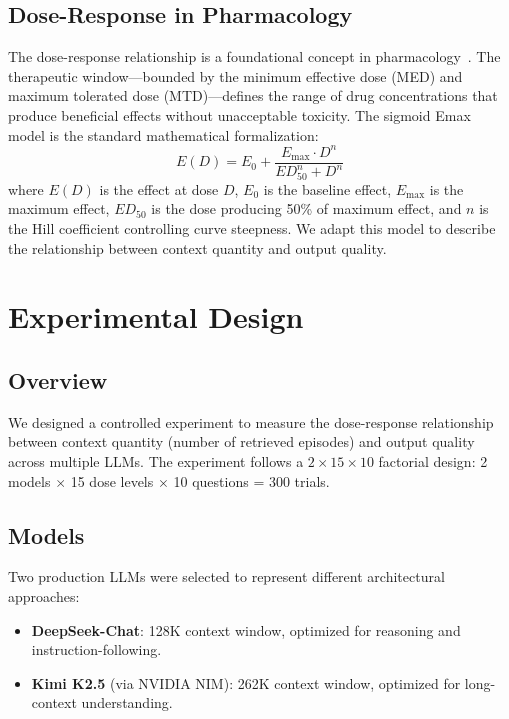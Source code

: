 \documentclass[11pt,a4paper]{article}
\begin{document}
\subsection{Dose-Response in Pharmacology}
The dose-response relationship is a foundational concept in pharmacology~\citep{clark1937dose}. The therapeutic window---bounded by the minimum effective dose (MED) and maximum tolerated dose (MTD)---defines the range of drug concentrations that produce beneficial effects without unacceptable toxicity. The sigmoid Emax model is the standard mathematical formalization:
\begin{equation}
  E(D) = E_0 + \frac{E_{\max} \cdot D^n}{ED_{50}^n + D^n}
  \label{eq:emax}
\end{equation}
where $E(D)$ is the effect at dose $D$, $E_0$ is the baseline effect, $E_{\max}$ is the maximum effect, $ED_{50}$ is the dose producing 50\% of maximum effect, and $n$ is the Hill coefficient controlling curve steepness. We adapt this model to describe the relationship between context quantity and output quality.

\section{Experimental Design}

\subsection{Overview}
We designed a controlled experiment to measure the dose-response relationship between context quantity (number of retrieved episodes) and output quality across multiple LLMs. The experiment follows a $2 \times 15 \times 10$ factorial design: 2 models $\times$ 15 dose levels $\times$ 10 questions = 300 trials.

\subsection{Models}
Two production LLMs were selected to represent different architectural approaches:
\begin{itemize}[itemsep=2pt]
  \item \textbf{DeepSeek-Chat}: 128K context window, optimized for reasoning and instruction-following.
  \item \textbf{Kimi K2.5} (via NVIDIA NIM): 262K context window, optimized for long-context understanding.
\end{itemize}
\end{document}
